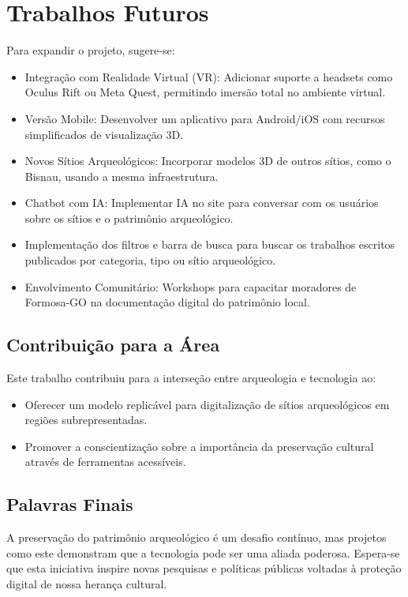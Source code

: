\section{Trabalhos Futuros} \label{sec:futuro}

Para expandir o projeto, sugere-se:

\begin{itemize}
    \item Integração com Realidade Virtual (VR): Adicionar suporte a headsets como Oculus Rift ou Meta Quest, permitindo imersão total no ambiente virtual.
    \item Versão Mobile: Desenvolver um aplicativo para Android/iOS com recursos simplificados de visualização 3D.
    \item Novos Sítios Arqueológicos: Incorporar modelos 3D de outros sítios, como o Bisnau, usando a mesma infraestrutura.
    \item Chatbot com IA: Implementar IA no site para conversar com os usuários sobre os sítios e o patrimônio arqueológico.
    \item Implementação dos filtros e barra de busca para buscar os trabalhos escritos publicados por categoria, tipo ou sítio arqueológico.
    \item Envolvimento Comunitário: Workshops para capacitar moradores de Formosa-GO na documentação digital do patrimônio local.
\end{itemize}


\subsection{Contribuição para a Área}
Este trabalho contribuiu para a interseção entre arqueologia e tecnologia ao:
\begin{itemize}
    \item Oferecer um modelo replicável para digitalização de sítios arqueológicos em regiões subrepresentadas.
    \item Promover a conscientização sobre a importância da preservação cultural através de ferramentas acessíveis.
\end{itemize}

\subsection{Palavras Finais}
A preservação do patrimônio arqueológico é um desafio contínuo, mas projetos como este demonstram que a tecnologia pode ser uma aliada poderosa. Espera-se que esta iniciativa inspire novas pesquisas e políticas públicas voltadas à proteção digital de nossa herança cultural.